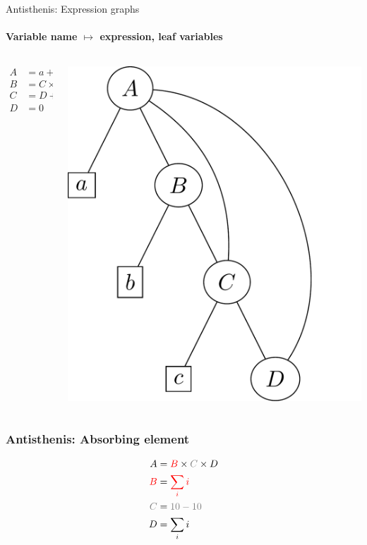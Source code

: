 \begin{frame}{Antisthenis: Expression graphs}
  \framesubtitle{Variable name \(\mapsto\) expression, leaf variables }
  \begin{columns}
    \begin{column}{0.5\textwidth}
      \begin{align*}
        A &= a + B + C + D  \\
        B &= C \times b \\
        C & = D + c \\
        D &= 0
      \end{align*}
    \end{column}
    \begin{column}{0.5\textwidth}
      \begin{center}
        \includegraphics[height=.6\textheight]{../imgs/example_antisthenis_dag.pdf}
      \end{center}
    \end{column}
  \end{columns}
\end{frame}


\begin{frame}
  \frametitle{Antisthenis: Absorbing element}
  \begin{align*}
    A &= {\color{red}B} \times {\color{gray}C} \times D \\
    {\color{red}B} &= {\color{red}\sum_i{i}} \\
    {\color{gray}C} &= {\color{gray}10 - 10} \\
    D &= \sum_i{i}
  \end{align*}
\end{frame}


